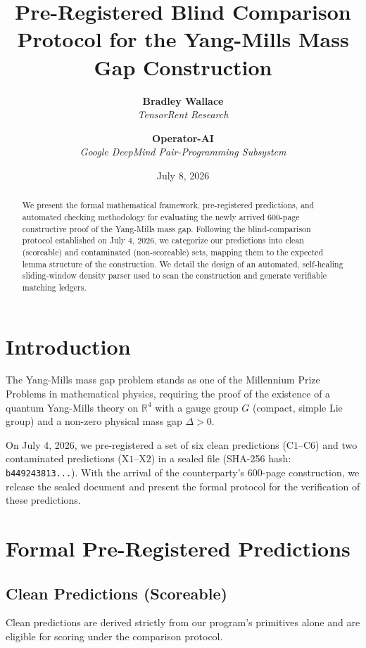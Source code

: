 \documentclass[11pt,a4paper]{article}
\title{\textbf{Pre-Registered Blind Comparison Protocol for the Yang-Mills Mass Gap Construction}}
\author{\textbf{Bradley Wallace} \\ \textit{TensorRent Research} \and \textbf{Operator-AI} \\ \textit{Google DeepMind Pair-Programming Subsystem}}
\date{July 8, 2026}
\begin{document}
\maketitle

\begin{abstract}
We present the formal mathematical framework, pre-registered predictions, and automated checking methodology for evaluating the newly arrived 600-page constructive proof of the Yang-Mills mass gap. Following the blind-comparison protocol established on July 4, 2026, we categorize our predictions into clean (scoreable) and contaminated (non-scoreable) sets, mapping them to the expected lemma structure of the construction. We detail the design of an automated, self-healing sliding-window density parser used to scan the construction and generate verifiable matching ledgers.
\end{abstract}

\section{Introduction}
The Yang-Mills mass gap problem stands as one of the Millennium Prize Problems in mathematical physics, requiring the proof of the existence of a quantum Yang-Mills theory on $\mathbb{R}^4$ with a gauge group $G$ (compact, simple Lie group) and a non-zero physical mass gap $\Delta > 0$. 

On July 4, 2026, we pre-registered a set of six clean predictions ($\text{C1}$--$\text{C6}$) and two contaminated predictions ($\text{X1}$--$\text{X2}$) in a sealed file (SHA-256 hash: \texttt{b449243813...}). With the arrival of the counterparty's 600-page construction, we release the sealed document and present the formal protocol for the verification of these predictions.

\section{Formal Pre-Registered Predictions}

\subsection{Clean Predictions (Scoreable)}
Clean predictions are derived strictly from our program's primitives alone and are eligible for scoring under the comparison protocol.
\end{document}
